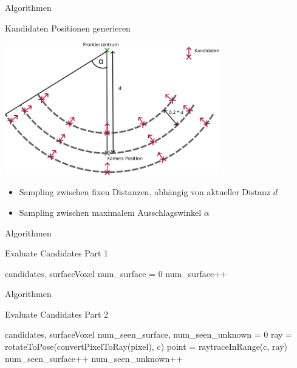 \documentclass{beamer}
\begin{document}
\begin{frame}{Algorithmen}
	\begin{block}{Kandidaten Positionen generieren}

		\begin{center}
			\includegraphics[width=0.7\textwidth]{Graphics/view_point_gen_v2.png}
		\end{center}
		\begin{itemize}
			\item Sampling zwischen fixen Distanzen, abhängig von aktueller Distanz $d$
			\item Sampling zwischen maximalem Ausschlagswinkel $\alpha$
		\end{itemize}
	\end{block}

\end{frame}

\begin{frame}{Algorithmen}
	\begin{algorithm}[H]
		\caption{Evaluate Candidates Part 1}
		\begin{algorithmic}[2]
			\Require candidates, surfaceVoxel
			\State num\_surface = 0
			\State num\_surface++
			\EndIf
			\EndFor
			\EndFor

		\end{algorithmic}
	\end{algorithm}

\end{frame}

\begin{frame}{Algorithmen}
	\begin{algorithm}[H]
		\caption{Evaluate Candidates Part 2}
		\begin{algorithmic}[2]
			\Require candidates, surfaceVoxel
			\State num\_seen\_surface, num\_seen\_unknown = 0
			\State ray = rotateToPose(convertPixelToRay(pixel), c)
			\State point = {\color{blue}raytraceInRange(c, ray)}
			\State num\_seen\_surface++
			\EndIf
			\State num\_seen\_unknown++
			\EndIf
			\EndFor
			\EndFor

		\end{algorithmic}
	\end{algorithm}

\end{frame}
\end{document}
